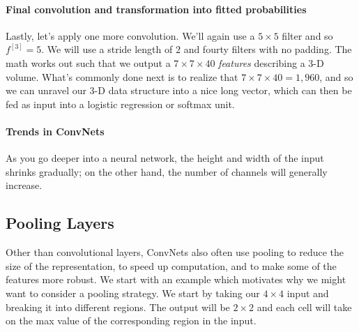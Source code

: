 \documentclass[12pt]{article}
\begin{document}
\paragraph{Final convolution and transformation into fitted probabilities}
Lastly, let's apply one more convolution. We'll again use a $5 \times 5$ filter and so
$f^{[3]} = 5$. We will use a stride length of $2$ and fourty filters with no padding. The math works out 
such that we output a $7 \times 7 \times 40$ \emph{features} describing a 3-D volume. What's commonly done 
next is to realize that $7 \times 7 \times 40 = 1,960$, and so we can unravel our 3-D data structure
into a nice long vector, which can then be fed as input into a logistic regression or softmax unit.

\paragraph{Trends in ConvNets} As you go deeper into a neural network, the height and width of the input shrinks gradually; on
the other hand, the number of channels will generally increase. 

\subsection{Pooling Layers} Other than convolutional layers, ConvNets also often use pooling to reduce the size of the representation, to speed up computation, and to make some of the features more robust. We start with an example which motivates why we might
want to consider a pooling strategy. We start by taking our $4 \times 4$ input and breaking it into different regions. The output will be $2 \times 2$ and each cell will take on the max value of the corresponding region in the input.
\end{document}
